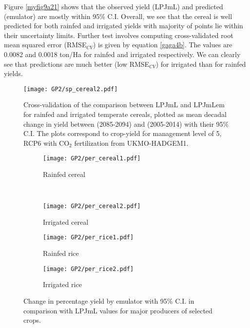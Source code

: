 Figure \ref{myfig9a21} shows that the observed yield (LPJmL) and predicted (emulator) are mostly within 95\% C.I. 
Overall, we see that the cereal is well predicted for both rainfed and irrigated yields with majority of points lie within their uncertainty limits. Further test involves computing cross-validated root mean squared error (RMSE$_{CV}$) is given by equation \ref{gaga4b}. The values are 0.0082 and 0.0018 ton/Ha for rainfed and irrigated respectively. We can clearly see that predictions are much better (low RMSE$_{CV}$) for irrigated than for rainfed yields.

\begin{figure}[!ht] 
\texttt{[image: GP2/sp\_cereal2.pdf]}
\caption[]{Cross-validation of the comparison between LPJmL and LPJmLem for rainfed and irrigated temperate cereals, plotted as mean decadal change in yield between (2085-2094) and (2005-2014) with their 95\% C.I. The plots correspond to crop-yield for management level of 5, RCP6 with CO$_2$ fertilization from UKMO-HADGEM1.}\label{Va}
\end{figure}

\begin{figure}[!htb]%
\begin{subfigure}[b]{\textwidth}
\centering
\texttt{[image: GP2/per\_cereal1.pdf]}
\caption{Rainfed cereal}
\label{per1a}
\end{subfigure}\\
\begin{subfigure}[b]{\textwidth}
\centering
\texttt{[image: GP2/per\_cereal2.pdf]}
\caption{Irrigated cereal}
\label{per2a}
\end{subfigure}
\begin{subfigure}[b]{\textwidth}
\centering
\texttt{[image: GP2/per\_rice1.pdf]}
\caption{Rainfed rice}
\label{per3a}
\end{subfigure}
\begin{subfigure}[b]{\textwidth}
\centering
\texttt{[image: GP2/per\_rice2.pdf]}
\caption{Irrigated rice}
\label{per4a}
\end{subfigure}
\caption{Change in percentage yield by emulator with 95\% C.I. in comparison with LPJmL values for major producers of selected crops.}
\end{figure}

